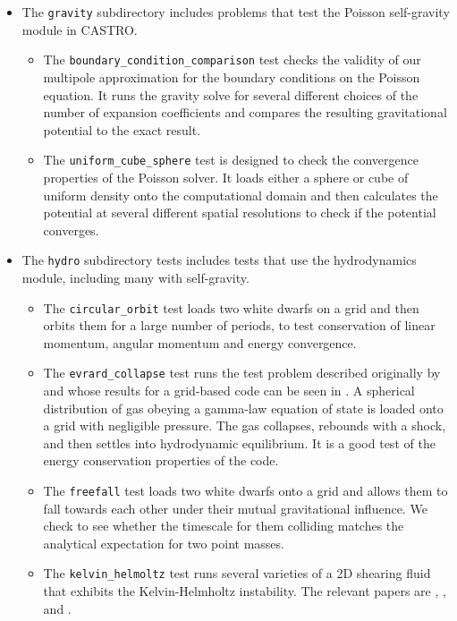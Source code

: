 \documentclass[12pt]{book}
\begin{document}
\begin{itemize}
  \item The \texttt{gravity} subdirectory includes problems that test the Poisson 
self-gravity module in CASTRO.
  \begin{itemize}
    \item The \texttt{boundary\_condition\_comparison} test checks the validity of our 
multipole approximation for the boundary conditions on the Poisson equation. It runs
the gravity solve for several different choices of the number of expansion coefficients
and compares the resulting gravitational potential to the exact result.
    \item The \texttt{uniform\_cube\_sphere} test is designed to check the convergence
properties of the Poisson solver. It loads either a sphere or cube of uniform density
onto the computational domain and then calculates the potential at several different
spatial resolutions to check if the potential converges.
  \end{itemize}
  \item The \texttt{hydro} subdirectory tests includes tests that use the hydrodynamics 
module, including many with self-gravity.
  \begin{itemize}
    \item The \texttt{circular\_orbit} test loads two white dwarfs on a grid and then orbits
them for a large number of periods, to test conservation of linear momentum,
angular momentum and energy convergence.
    \item The \texttt{evrard\_collapse} test runs the test problem described originally by 
\cite{evrard:1988} and whose results for a grid-based code can be seen in \cite{arepo}. A spherical
distribution of gas obeying a gamma-law equation of state is loaded onto a grid with negligible 
pressure. The gas collapses, rebounds with a shock, and then settles into hydrodynamic equilibrium.
It is a good test of the energy conservation properties of the code.
    \item The \texttt{freefall} test loads two white dwarfs onto a grid and allows them to fall towards
each other under their mutual gravitational influence. We check to see whether the timescale for them
colliding matches the analytical expectation for two point masses.
    \item The \texttt{kelvin\_helmoltz} test runs several varieties of a 2D shearing fluid that exhibits the 
Kelvin-Helmholtz instability. The relevant papers are \cite{robertson:2010}, \cite{arepo}, and \cite{mcnally:2012}.

\end{itemize}
\end{itemize}
\end{document}
